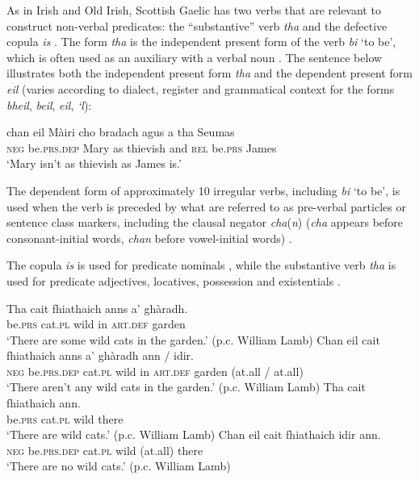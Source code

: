 ﻿\documentclass[output=paper]{langsci/langscibook}
\begin{document}
\begin{unindented}
As in Irish and Old Irish, Scottish Gaelic has two verbs that are relevant
to construct non-verbal predicates: the ``substantive'' verb \textit{tha} and the defective copula \textit{is} \citep[65]{Lamb2001}. The form \textit{tha} is the independent present form of the verb \textit{bi} `to be', which is often used as an auxiliary with a verbal noun \citep[54]{Lamb2001}. The sentence below illustrates both the independent present form \textit{tha} and the dependent present form \textit{eil} (varies according to dialect, register and grammatical context for the forms \textit{bheil}, \textit{beil}, \textit{eil}, \textit{‘l}): 
%
\begin{exe}\ex \gll chan eil Màiri cho bradach agus a tha Seumas \\
\textsc{neg}  be.\textsc{prs.dep} Mary  as    thievish and   \textsc{rel} be.\textsc{prs} James \\
    \glt `Mary isn't as thievish as James is.' \citep[42]{Lamb2001}
    \end{exe}

The dependent form of approximately 10 irregular verbs, including
\textit{bi} `to be', is used when the verb is preceded by what are referred
to as pre-verbal particles or sentence class markers, including the clausal
negator \textit{cha}(\textit{n}) (\textit{cha} appears before consonant-initial words, \textit{chan} before vowel-initial words) \citep[48--50]{Lamb2001}.

The copula \textit{is} is used for predicate nominals \citep[66--67]{Lamb2001}, while the substantive verb \textit{tha} is used for predicate adjectives, locatives, possession and existentials \citep[67--69]{Lamb2001}.
%
\begin{exe}\ex \gll Tha cait fhiathaich anns a’ ghàradh. \\
be.\textsc{prs} cat.\textsc{pl} wild in \textsc{art.def} garden \\
    \glt `There are some wild cats in the garden.' (p.c. William Lamb)
\ex\label{ex:ieur-app-gaelic-nocatsingarden} \gll Chan eil cait fhiathaich anns a’ ghàradh {\op}ann / idir{\cp}. \\
\textsc{neg}    be.\textsc{prs}.\textsc{dep} cat.\textsc{pl} wild          in     \textsc{art}.\textsc{def} garden (at.all / at.all) \\
    \glt `There aren't any wild cats in the garden.' (p.c. William Lamb)
\ex\label{ex:ieur-app-gaelic-yescatplease} 
\gll Tha cait fhiathaich ann. \\
        be.\textsc{prs} cat.\textsc{pl}  wild there \\
    \glt `There are wild cats.' (p.c. William Lamb)
\ex\label{ex:ieur-app-gaelic-nocatsnow} \gll Chan  eil cait fhiathaich {\op}idir{\cp}    ann. \\
\textsc{neg}    be.\textsc{prs.dep}  cat.\textsc{pl} wild           (at.all) there \\
    \glt `There are no wild cats.' (p.c. William Lamb)
\end{exe}


\end{unindented}
\end{document}
